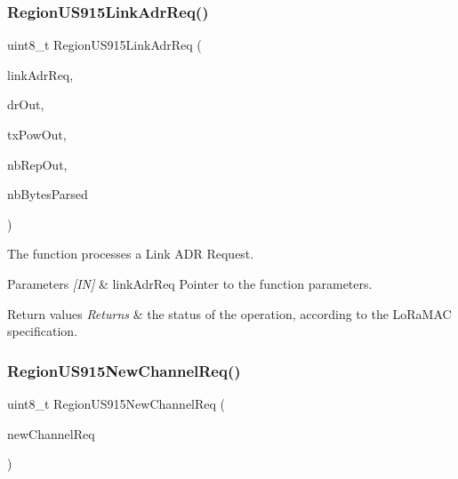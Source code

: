 \subsubsection{\texorpdfstring{Region\+U\+S915\+Link\+Adr\+Req()}{RegionUS915LinkAdrReq()}}
{\footnotesize\ttfamily uint8\+\_\+t Region\+U\+S915\+Link\+Adr\+Req (\begin{DoxyParamCaption}\item[{\hyperlink{group__REGION_gad4af503e8d4de1846129e26a799a1e8e}{Link\+Adr\+Req\+Params\+\_\+t} $\ast$}]{link\+Adr\+Req,  }\item[{int8\+\_\+t $\ast$}]{dr\+Out,  }\item[{int8\+\_\+t $\ast$}]{tx\+Pow\+Out,  }\item[{uint8\+\_\+t $\ast$}]{nb\+Rep\+Out,  }\item[{uint8\+\_\+t $\ast$}]{nb\+Bytes\+Parsed }\end{DoxyParamCaption})}



The function processes a Link A\+DR Request. 


\begin{DoxyParams}{Parameters}
{\em \mbox{[}\+I\+N\mbox{]}} & link\+Adr\+Req Pointer to the function parameters.\\
\hline
\end{DoxyParams}

\begin{DoxyRetVals}{Return values}
{\em Returns} & the status of the operation, according to the Lo\+Ra\+M\+AC specification. \\
\hline
\end{DoxyRetVals}
\mbox{\label{group__REGIONUS915_gaf6b93716eae04bcc5a2072b2f071fb0d}} 
\subsubsection{\texorpdfstring{Region\+U\+S915\+New\+Channel\+Req()}{RegionUS915NewChannelReq()}}
{\footnotesize\ttfamily uint8\+\_\+t Region\+U\+S915\+New\+Channel\+Req (\begin{DoxyParamCaption}\item[{\hyperlink{group__REGION_gae2abcdb6dbb843c9faf5fd3009eca9d6}{New\+Channel\+Req\+Params\+\_\+t} $\ast$}]{new\+Channel\+Req }\end{DoxyParamCaption})}



